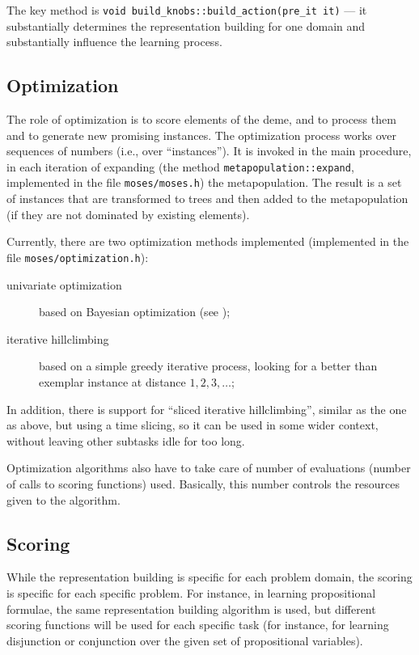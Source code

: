 \documentclass{article}
\begin{document}
The key method is \verb|void build_knobs::build_action(pre_it it)|
--- it substantially determines the representation building for
one domain and substantially influence the learning process.

\subsection{Optimization}

The role of optimization is to score elements of the deme, and to 
process them and to generate new promising instances. The optimization 
process works over sequences of numbers (i.e., over ``instances'').
It is invoked in the main procedure, in each iteration of expanding
(the method \verb|metapopulation::expand|, implemented in the file
\verb|moses/moses.h|) the metapopulation. The result is a set of 
instances that are transformed to trees and then added to the 
metapopulation (if they are not dominated by existing elements).  

Currently, there are two optimization methods implemented
(implemented in the file \verb|moses/optimization.h|): 
\begin{description}
\item[univariate optimization] based on Bayesian optimization (see \cite{6});

\item[iterative hillclimbing] based on a simple greedy iterative process, 
looking for a better than exemplar instance at distance $1, 2, 3, \ldots$;
\end{description}


In addition, there is support for ``sliced iterative hillclimbing'',
similar as the one as above, but using a time slicing, so it can be used
 in some wider context, without leaving other subtasks idle for too long.

Optimization algorithms also have to take care of number of evaluations
(number of calls to scoring functions) used. Basically, this number
controls the resources given to the algorithm.


\subsection{Scoring}

While the representation building is specific for each problem domain,
the scoring is specific for each specific problem. For instance, in
learning propositional formulae, the same representation building
algorithm is used, but different scoring functions will be used
for each specific task (for instance, for learning disjunction
or conjunction over the given set of propositional variables).
\end{document}
